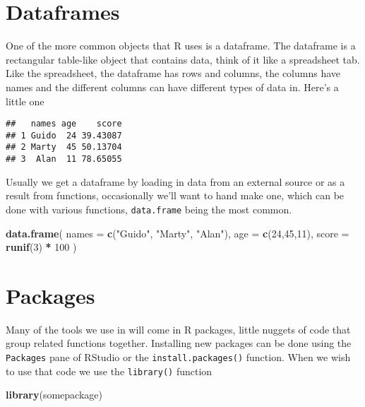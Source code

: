 \documentclass[
]{book}
\newenvironment{Shaded}{\begin{snugshade}}{\end{snugshade}}
\newcommand{\DataTypeTok}[1]{\textcolor[rgb]{0.13,0.29,0.53}{#1}}
\newcommand{\DecValTok}[1]{\textcolor[rgb]{0.00,0.00,0.81}{#1}}
\newcommand{\KeywordTok}[1]{\textcolor[rgb]{0.13,0.29,0.53}{\textbf{#1}}}
\newcommand{\NormalTok}[1]{#1}
\newcommand{\OperatorTok}[1]{\textcolor[rgb]{0.81,0.36,0.00}{\textbf{#1}}}
\newcommand{\StringTok}[1]{\textcolor[rgb]{0.31,0.60,0.02}{#1}}
\begin{document}
\hypertarget{dataframes}{%
\section{Dataframes}\label{dataframes}}

One of the more common objects that R uses is a dataframe. The dataframe is a rectangular table-like object that contains data, think of it like a spreadsheet tab. Like the spreadsheet, the dataframe has rows and columns, the columns have names and the different columns can have different types of data in. Here's a little one

\begin{verbatim}
##   names age    score
## 1 Guido  24 39.43087
## 2 Marty  45 50.13704
## 3  Alan  11 78.65055
\end{verbatim}

Usually we get a dataframe by loading in data from an external source or as a result from functions, occasionally we'll want to hand make one, which can be done with various functions, \texttt{data.frame} being the most common.

\begin{Shaded}
\begin{Highlighting}[]
\KeywordTok{data.frame}\NormalTok{(}
  \DataTypeTok{names =} \KeywordTok{c}\NormalTok{(}\StringTok{"Guido"}\NormalTok{, }\StringTok{"Marty"}\NormalTok{, }\StringTok{"Alan"}\NormalTok{),}
  \DataTypeTok{age =} \KeywordTok{c}\NormalTok{(}\DecValTok{24}\NormalTok{,}\DecValTok{45}\NormalTok{,}\DecValTok{11}\NormalTok{),}
  \DataTypeTok{score =} \KeywordTok{runif}\NormalTok{(}\DecValTok{3}\NormalTok{) }\OperatorTok{*}\StringTok{ }\DecValTok{100}
\NormalTok{)}
\end{Highlighting}
\end{Shaded}

\hypertarget{packages}{%
\section{Packages}\label{packages}}

Many of the tools we use in will come in R packages, little nuggets of code that group related functions together. Installing new packages can be done using the \texttt{Packages} pane of RStudio or the \texttt{install.packages()} function. When we wish to use that code we use the \texttt{library()} function

\begin{Shaded}
\begin{Highlighting}[]
\KeywordTok{library}\NormalTok{(somepackage)}
\end{Highlighting}
\end{Shaded}
\end{document}
